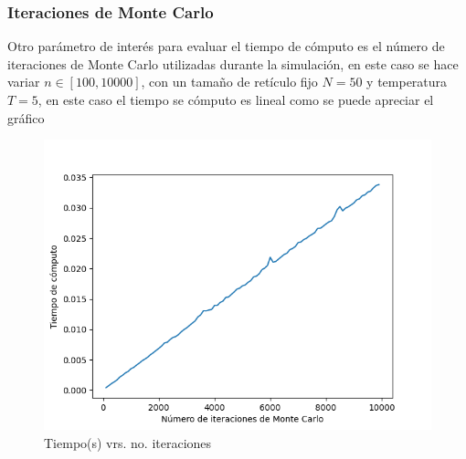 \documentclass[a4paper]{article}
\begin{document}
\subsubsection{Iteraciones de Monte Carlo}
Otro parámetro de interés para evaluar el tiempo de cómputo es el número de iteraciones de Monte Carlo utilizadas durante la simulación, en este caso se hace variar $n\in [100,10000]$, con un tamaño de retículo fijo $N=50$ y temperatura $T=5$, en este caso el tiempo se cómputo es lineal como se puede apreciar el gráfico
\begin{figure}[H]
\begin{center}
\includegraphics[scale=0.6]{time_vrs_MC_iterations.png} 
\end{center} 
\caption{Tiempo(s) vrs. no. iteraciones}
\end{figure}
\end{document}

